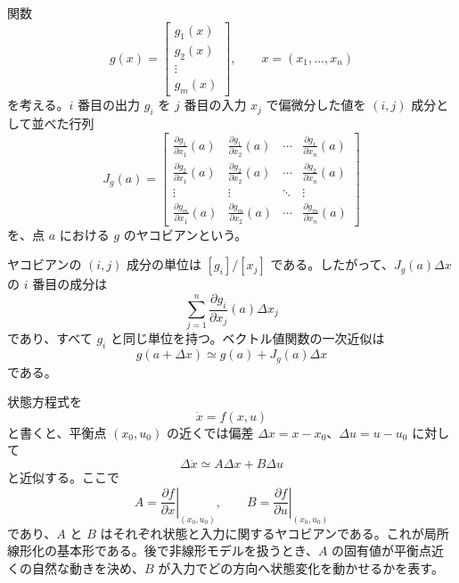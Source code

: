 \begin{definition}[ヤコビアン]
関数
\begin{equation}
  g(x)=
  \begin{bmatrix}
    g_1(x)\\
    g_2(x)\\
    \vdots\\
    g_m(x)
  \end{bmatrix},
  \qquad
  x=(x_1,\ldots,x_n)
\end{equation}
を考える。$i$ 番目の出力 $g_i$ を $j$ 番目の入力 $x_j$ で偏微分した値を $(i,j)$ 成分として並べた行列
\begin{equation}
  J_g(a)
  =
  \begin{bmatrix}
    \frac{\partial g_1}{\partial x_1}(a)&
    \frac{\partial g_1}{\partial x_2}(a)&
    \cdots&
    \frac{\partial g_1}{\partial x_n}(a)\\
    \frac{\partial g_2}{\partial x_1}(a)&
    \frac{\partial g_2}{\partial x_2}(a)&
    \cdots&
    \frac{\partial g_2}{\partial x_n}(a)\\
    \vdots&\vdots&\ddots&\vdots\\
    \frac{\partial g_m}{\partial x_1}(a)&
    \frac{\partial g_m}{\partial x_2}(a)&
    \cdots&
    \frac{\partial g_m}{\partial x_n}(a)
  \end{bmatrix}
\end{equation}
を、点 $a$ における $g$ のヤコビアンという。
\end{definition}

ヤコビアンの $(i,j)$ 成分の単位は $[g_i]/[x_j]$ である。したがって、$J_g(a)\Delta x$ の $i$ 番目の成分は
\begin{equation}
  \sum_{j=1}^{n}
  \frac{\partial g_i}{\partial x_j}(a)\Delta x_j
\end{equation}
であり、すべて $g_i$ と同じ単位を持つ。ベクトル値関数の一次近似は
\begin{equation}
  g(a+\Delta x)
  \simeq
  g(a)+J_g(a)\Delta x
\end{equation}
である。

状態方程式を
\begin{equation}
  \dot{x}=f(x,u)
\end{equation}
と書くと、平衡点 $(x_0,u_0)$ の近くでは偏差 $\Delta x=x-x_0$、$\Delta u=u-u_0$ に対して
\begin{equation}
  \Delta\dot{x}
  \simeq
  A\Delta x+B\Delta u
\end{equation}
と近似する。ここで
\begin{equation}
  A=
  \left.\frac{\partial f}{\partial x}\right|_{(x_0,u_0)},
  \qquad
  B=
  \left.\frac{\partial f}{\partial u}\right|_{(x_0,u_0)}
\end{equation}
であり、$A$ と $B$ はそれぞれ状態と入力に関するヤコビアンである。これが局所線形化の基本形である。後で非線形モデルを扱うとき、$A$ の固有値が平衡点近くの自然な動きを決め、$B$ が入力でどの方向へ状態変化を動かせるかを表す。

